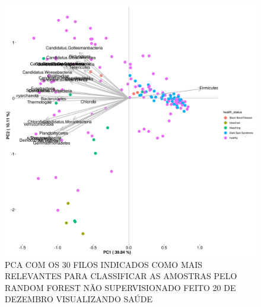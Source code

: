 \documentclass[12pt, a4paper]{report}
\begin{document}
\begin{figure}[H]
	\centering
	\includegraphics[scale=0.4]{figures/PCA_rf_nao_super_30_157_corais_health_2018_12_20.png}
	\caption{PCA COM OS 30 FILOS INDICADOS COMO MAIS RELEVANTES PARA CLASSIFICAR AS AMOSTRAS PELO RANDOM FOREST NÃO SUPERVISIONADO FEITO 20 DE DEZEMBRO VISUALIZANDO SAÚDE}
	\label{fig: PCACOMOS30FILOSINDICADOSCOMOMAISRELEVANTES PARACLASSIFICAR AS AMOSTRAS PELO RANDOM FOREST NÃO SUPERVISIONADO FEITO 20 DE DEZEMBRO VISUALIZANDO SAÚDE}
\end{figure}
\end{document}
